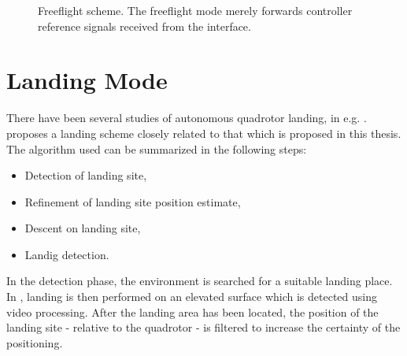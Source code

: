         \begin{figure}[H]
            \noindent{}
            \caption{Freeflight scheme. The freeflight mode merely forwards controller reference signals received from the interface.}
            \label{fig:logic:freeflightscheme}
        \end{figure}

    \section{Landing Mode}
        \label{ssec:logic:landing}
        There have been several studies of autonomous quadrotor landing,
        in e.g. \citep{mellinger10perching,brockers:803111}.
        \citep{brockers:803111} proposes a landing scheme closely related to
        that which is proposed in this thesis.
        The algorithm used can be summarized in the following steps:
        \begin{itemize}
            \item Detection of landing site,
            \item Refinement of landing site position estimate,
            \item Descent on landing site,
            \item Landig detection.
        \end{itemize}

        In the detection phase, the environment is searched for a suitable
        landing place. In \citep{brockers:803111}, landing is then performed on an elevated surface which is detected using video processing.
        After the landing area has been located, the position of the
        landing site - relative to the quadrotor - is filtered to increase the
        certainty of the positioning.

